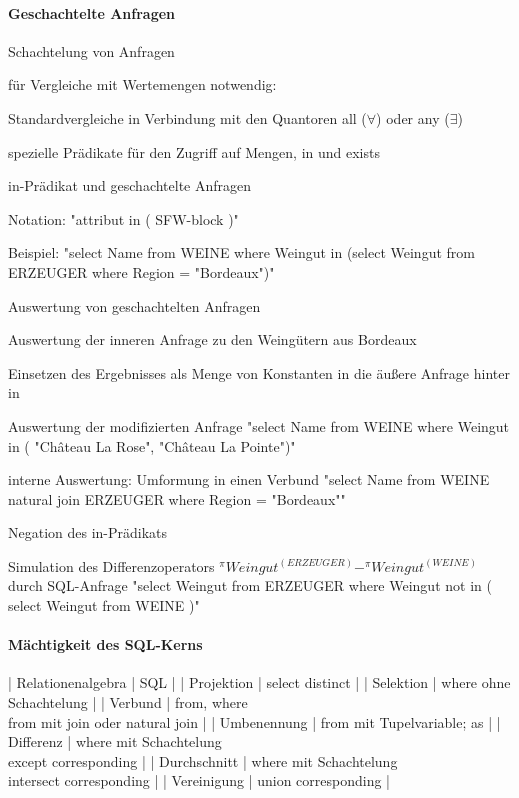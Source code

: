 \documentclass[a4paper]{article}
\begin{document}
\begin{multicols}{3}
\paragraph{Geschachtelte Anfragen}
Schachtelung von Anfragen
\begin{itemize*}
    \item für Vergleiche mit Wertemengen notwendig:
    \item Standardvergleiche in Verbindung mit den Quantoren all ($\forall$) oder any ($\exists$)
    \item spezielle Prädikate für den Zugriff auf Mengen, in und exists
    \item in-Prädikat und geschachtelte Anfragen
    \begin{itemize*}
        \item Notation: "attribut in ( SFW-block )"
        \item Beispiel: "select Name from WEINE where Weingut in (select Weingut from ERZEUGER where Region = "Bordeaux")"
        \item Auswertung von geschachtelten Anfragen
        \begin{itemize*}
            \item Auswertung der inneren Anfrage zu den Weingütern aus Bordeaux
            \item Einsetzen des Ergebnisses als Menge von Konstanten in die äußere Anfrage hinter in
            \item Auswertung der modifizierten Anfrage "select Name from WEINE where Weingut in ( "Château La Rose", "Château La Pointe")"
        \end{itemize*}
        \item interne Auswertung: Umformung in einen Verbund
        "select Name from WEINE natural join ERZEUGER where Region = "Bordeaux""
    \end{itemize*}
    \item Negation des in-Prädikats
    \begin{itemize*}
        \item Simulation des Differenzoperators $^\pi Weingut^{(ERZEUGER)}- ^\pi Weingut^{(WEINE)}$ durch SQL-Anfrage "select Weingut from ERZEUGER where Weingut not in ( select Weingut from WEINE )"
    \end{itemize*}
\end{itemize*}


\paragraph{Mächtigkeit des SQL-Kerns}
| Relationenalgebra  | SQL |
| Projektion | select distinct |
| Selektion | where ohne Schachtelung |
| Verbund | from, where\\ from mit join oder natural join |
| Umbenennung | from mit Tupelvariable; as |
| Differenz | where mit Schachtelung\\ except corresponding |
| Durchschnitt | where mit Schachtelung\\ intersect corresponding |
| Vereinigung | union corresponding |


\end{multicols}
\end{document}

